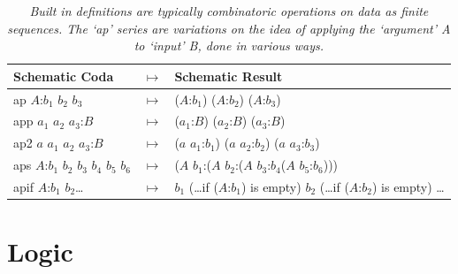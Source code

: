 \documentclass[11pt]{article}
\begin{document}
\begin{table}
\begin{tabular}{| l  l  l | }
Schematic Coda & $\mapsto$ & Schematic Result \\
\hline
ap $A$:$b_1$ $b_2$ $b_3$ & $\mapsto$ & ($A$:$b_1$) ($A$:$b_2$) ($A$:$b_3$) \\
app $a_1$ $a_2$ $a_3$:$B$ &  $\mapsto$ & ($a_1$:$B$) ($a_2$:$B$) ($a_3$:$B$) \\
ap2 $a$ $a_1$ $a_2$ $a_3$:$B$ & $\mapsto$ & ($a$ $a_1$:$b_1$) ($a$ $a_2$:$b_2$) ($a$ $a_3$:$b_3$) \\
aps $A$:$b_1$ $b_2$ $b_3$ $b_4$ $b_5$ $b_6$ & $\mapsto$ & ($A$ $b_1$:($A$ $b_2$:($A$ $b_3$:$b_4$($A$ $b_5$:$b_6$))) \\
apif $A$:$b_1$ $b_2$\dots & $\mapsto$ & $b_1$ (\dots if ($A$:$b_1$) is empty) $b_2$ (\dots if ($A$:$b_2$) is empty) \dots \\
\hline
\end{tabular}
\caption{\label{ }{\it Built in definitions are typically combinatoric operations on data as finite sequences.  The `ap' series are variations on the
idea of applying the `argument' A to `input' B, done in various ways.}}
\end{table}

\section{Logic}
\end{document}
